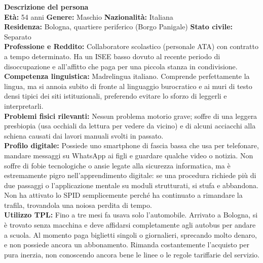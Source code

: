 ﻿\documentclass[11pt,a4paper]{article}
\begin{document}
\begin{tcolorbox}[base]
    \textbf{Descrizione del persona} \\[4pt]
    {\small
    \textbf{Età:} 54 anni \hfill
    \textbf{Genere:} Maschio \hfill
    \textbf{Nazionalità:} Italiana
    \\[2pt]
    \textbf{Residenza:} Bologna, quartiere periferico (Borgo Panigale) \hfill
    \textbf{Stato civile:} Separato \\[2pt]
    \textbf{Professione e Reddito:} Collaboratore scolastico (personale ATA) con contratto a tempo determinato. Ha un ISEE basso dovuto al recente periodo di disoccupazione e all'affitto che paga per una piccola stanza in condivisione. \\[2pt]
    \textbf{Competenza linguistica:} Madrelingua italiano. Comprende perfettamente la lingua, ma si annoia subito di fronte al linguaggio burocratico e ai muri di testo densi tipici dei siti istituzionali, preferendo evitare lo sforzo di leggerli e interpretarli. \\[2pt]
    \textbf{Problemi fisici rilevanti:} Nessun problema motorio grave; soffre di una leggera presbiopia (usa occhiali da lettura per vedere da vicino) e di alcuni acciacchi alla schiena causati dai lavori manuali svolti in passato. \\[2pt]
    \textbf{Profilo digitale:} Possiede uno smartphone di fascia bassa che usa per telefonare, mandare messaggi su WhatsApp ai figli e guardare qualche video o notizia. Non soffre di fobie tecnologiche o ansie legate alla sicurezza informatica, ma è estremamente pigro nell'apprendimento digitale: se una procedura richiede più di due passaggi o l'applicazione mentale su moduli strutturati, si stufa e abbandona. Non ha attivato lo SPID semplicemente perché ha continuato a rimandare la trafila, trovandola una noiosa perdita di tempo. \\[2pt]
    \textbf{Utilizzo TPL:} Fino a tre mesi fa usava solo l'automobile. Arrivato a Bologna, si è trovato senza macchina e deve affidarsi completamente agli autobus per andare a scuola. Al momento paga biglietti singoli o giornalieri, sprecando molto denaro, e non possiede ancora un abbonamento. Rimanda costantemente l'acquisto per pura inerzia, non conoscendo ancora bene le linee o le regole tariffarie del servizio.
    }
\end{tcolorbox}

\vspace{0.3cm}

\end{document}
